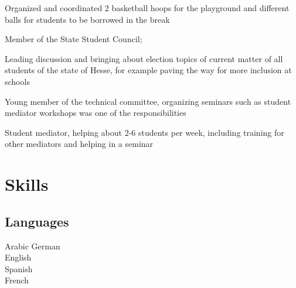 \begin{adjustwidth}{2.5cm}{1.9cm}
\begin{tightemize}
Organized and coordinated 2 basketball hoops for the playground and different balls for students to be borrowed in the break 
\item  Member of the State Student Council;

Leading discussion and bringing about election topics of current matter of all students of the state of Hesse, for example paving the way for more inclusion at schools
\end{tightemize}
\begin{tightemize} \vspace{-3pt}
\item Young member of the technical committee, organizing seminars such as student mediator workshops was one of the responsibilities 
\end{tightemize}
\begin{tightemize} \vspace{-3pt}
\item Student mediator, helping about 2-6 students per week, including training for other mediators and helping in a seminar
\end{tightemize}
\vspace{1mm}
\begin{minipage}[t]{0.25\textwidth}
\section{Skills}
\subsection{Languages}
{}
Arabic \textbullet{} German \\
{}
English \\
Spanish \\
French \\
\end{minipage}
\begin{minipage}[t]{0.25\textwidth}

\end{minipage}
\end{adjustwidth}
